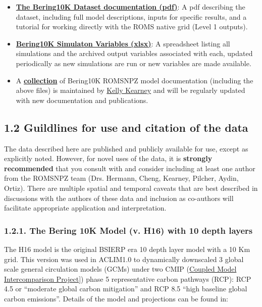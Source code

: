 \documentclass[
]{article}
\begin{document}
\begin{itemize}
\item
  \href{https://zenodo.org/record/4586950/files/Bering10K_dataset_documentation.pdf}{\textbf{The
  Bering10K Dataset documentation (pdf)}}: A pdf describing the dataset,
  including full model descriptions, inputs for specific results, and a
  tutorial for working directly with the ROMS native grid (Level 1
  outputs).
\item
  \href{https://zenodo.org/record/4586950/files/Bering10K_simulation_variables.xlsx?download=1}{\textbf{Bering10K
  Simulaton Variables (xlsx)}}: A spreadsheet listing all simulations
  and the archived output variables associated with each, updated
  periodically as new simulations are run or new variables are made
  available.
\item
  A
  \href{https://beringnpz.github.io/roms-bering-sea/B10K-dataset-docs/}{\textbf{collection}}
  of Bering10K ROMSNPZ model documentation (including the above files)
  is maintained by \href{mailto:kelly.kearney@noaa.gov}{Kelly Kearney}
  and will be regularly updated with new documentation and publications.
\end{itemize}

\hypertarget{guildlines-for-use-and-citation-of-the-data}{%
\subsection{1.2 Guildlines for use and citation of the
data}\label{guildlines-for-use-and-citation-of-the-data}}

The data described here are published and publicly available for use,
except as explicitly noted. However, for novel uses of the data, it is
\textbf{strongly recommended} that you consult with and consider
including at least one author from the ROMSNPZ team (Drs. Hermann,
Cheng, Kearney, Pilcher, Aydin, Ortiz). There are multiple spatial and
temporal caveats that are best described in discussions with the authors
of these data and inclusion as co-authors will facilitate appropriate
application and interpretation.

\hypertarget{the-bering-10k-model-v.-h16-with-10-depth-layers}{%
\subsubsection{1.2.1. The Bering 10K Model (v. H16) with 10 depth
layers}\label{the-bering-10k-model-v.-h16-with-10-depth-layers}}

The H16 model is the original BSIERP era 10 depth layer model with a 10
Km grid. This version was used in ACLIM1.0 to dynamically downscaled 3
global scale general circulation models (GCMs) under two CMIP
(\href{https://www.wcrp-climate.org/wgcm-cmip}{Coupled Model
Intercomparison Project}{]}) phase 5 representative carbon pathways
(RCP): RCP 4.5 or ``moderate global carbon mitigation'' and RCP 8.5
``high baseline global carbon emissions''. Details of the model and
projections can be found in:
\end{document}
